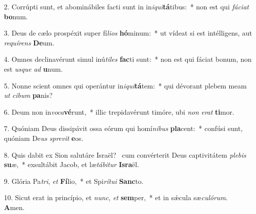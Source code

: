 2. Corrúpti sunt, et abominábiles facti sunt in in\textit{i}\textit{qui}\textbf{tá}tibus:~*  non est qui \textit{fá}\textit{ci}\textit{at} \textbf{bo}num.\

3. Deus de cælo prospéxit super fí\textit{li}\textit{os} \textbf{hó}minum:~*  ut vídeat si est intélligens, aut \textit{re}\textit{quí}\textit{rens} \textbf{De}um.\

4. Omnes declinavérunt simul inú\textit{ti}\textit{les} \textbf{fac}ti sunt:~*  non est qui fáciat bonum, non est \textit{us}\textit{que} \textit{ad} \textbf{u}num.\

5. Nonne scient omnes qui operántur in\textit{i}\textit{qui}\textbf{tá}tem:~*  qui dévorant plebem meam \textit{ut} \textit{ci}\textit{bum} \textbf{pa}nis?\

6. Deum non in\textit{vo}\textit{ca}\textbf{vé}runt,~*  illic trepidavérunt timóre, ubi \textit{non} \textit{e}\textit{rat} \textbf{ti}mor.\

7. Quóniam Deus dissipávit ossa eórum qui homí\textit{ni}\textit{bus} \textbf{pla}cent:~*  confúsi sunt, quóniam De\textit{us} \textit{spre}\textit{vit} \textbf{e}os.\

8. Quis dabit ex Sion salutáre Israël? \dag\  cum convérterit Deus captivitátem \textit{ple}\textit{bis} \textbf{su}æ,~*  exsultábit Jacob, et læ\textit{tá}\textit{bi}\textit{tur} \textbf{Is}\textbf{ra}ël.\

9. Glória Pa\textit{tri}, \textit{et} \textbf{Fí}lio,~*  et Spi\textit{rí}\textit{tu}\textit{i} \textbf{Sanc}to.\

10. Sicut erat in princípio, et \textit{nunc}, \textit{et} \textbf{sem}per,~*  et in sǽcula sæ\textit{cu}\textit{ló}\textit{rum}. \textbf{A}men.\

